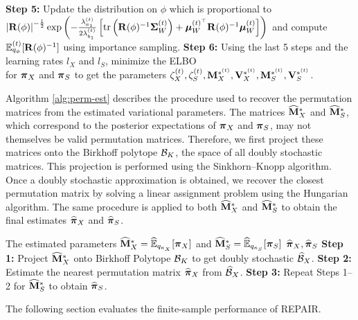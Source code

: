 \documentclass[numsec,webpdf,modern,medium,namedate]{oup-authoring-template}
\theoremstyle{thmstyleone}%
\theoremstyle{thmstyletwo}%
\theoremstyle{thmstylethree}%
\begin{document}
\begin{algorithm}[htbp]
\begin{algorithmic}
    \State \textbf{Step 5:} Update the distribution on $\phi$ which is proportional to \\
    \hspace{5mm}
    $\left|\mathbf{R}(\phi)\right|^{-\frac{1}{2}}\exp\left(-\frac{\lambda^{(t)}_{a_1}}{2\lambda^{(t)}_{b_1}} \left[\mathrm{tr}\left(\mathbf{R}(\phi)^{-1} \boldsymbol{\Sigma}^{(t)}_W\right) + \boldsymbol{\mu}_W^{{(t)}^\top} \mathbf{R}(\phi)^{-1} \boldsymbol{\mu}^{(t)}_W\right]\right)$ and compute\\
    \hspace{5mm} 
    $\mathbb{E}_{q_\phi}^{(t)}[\mathbf{R}(\phi)^{-1}]$ using importance sampling.
    \State \textbf{Step 6:} Using the last 5 steps and the learning rates $l_X$ and $l_S$, minimize the ELBO\\
    \hspace{5mm} for $\boldsymbol{\pi}_X$ and $\boldsymbol{\pi}_S$ to get the parameters $\zeta_X^{(t)},\zeta_S^{(t)},\mathbf{M}_X^{\ast^{(t)}}, \mathbf{V}_X^{\ast^{(t)}}, \mathbf{M}_S^{\ast^{(t)}}, \mathbf{V}_S^{\ast^{(t)}}$.
\EndWhile
\end{algorithmic}
\end{algorithm}
Algorithm \ref{alg:perm-est} describes the procedure used to recover the permutation matrices from the estimated variational parameters. The matrices $\widehat{\mathbf{M}}^\ast_X$ and $\widehat{\mathbf{M}}^\ast_S$, which correspond to the posterior expectations of $\boldsymbol{\pi}_X$ and $\boldsymbol{\pi}_S$, may not themselves be valid permutation matrices. Therefore, we first project these matrices onto the Birkhoff polytope $\mathcal{B}_K$, the space of all doubly stochastic matrices. This projection is performed using the Sinkhorn–Knopp algorithm.
Once a doubly stochastic approximation is obtained, we recover the closest permutation matrix by solving a linear assignment problem using the Hungarian algorithm. The same procedure is applied to both $\widehat{\mathbf{M}}^\ast_X$ and $\widehat{\mathbf{M}}^\ast_S$ to obtain the final estimates $\widehat{\boldsymbol{\pi}}_X$ and $\widehat{\boldsymbol{\pi}}_S$.
\begin{algorithm}[htbp]
\small
\caption{Algorithm for estimating the permutation matrices}
\label{alg:perm-est}
    \begin{algorithmic}
        \Require The estimated parameters $\widehat{\mathbf{M}}^\ast_X = \widehat{\mathbb{E}}_{q_{\kappa_X}}[\boldsymbol{\pi}_X]$ and $\widehat{\mathbf{M}}^\ast_S = \widehat{\mathbb{E}}_{q_{\kappa_S}}[\boldsymbol{\pi}_S]$
        \Ensure $\widehat{\boldsymbol{\pi}}_X,\widehat{\boldsymbol{\pi}}_S$
        \State \textbf{Step 1:} Project $\widehat{\mathbf{M}}^\ast_X$ onto Birkhoff Polytope $\mathcal{B}_K$ to get doubly stochastic $\widehat{\mathcal{B}}_X$.
        \State \textbf{Step 2:} Estimate the nearest permutation matrix $\widehat{\boldsymbol{\pi}}_X$ from $\widehat{\mathcal{B}}_X$. 
        \State \textbf{Step 3:} Repeat Steps 1--2 for $\widehat{\mathbf{M}}^\ast_S$ to obtain $\widehat{\boldsymbol{\pi}}_S$.
    \end{algorithmic}
\end{algorithm}
The following section evaluates the finite-sample performance of REPAIR.
\end{document}
